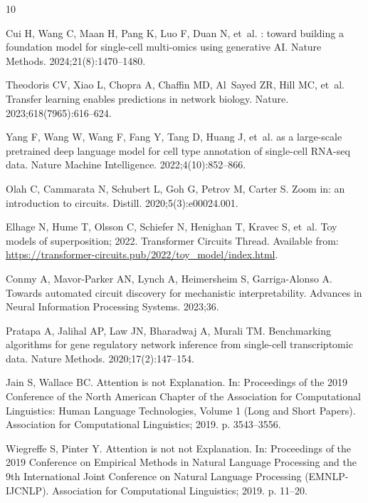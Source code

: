 \documentclass[10pt,letterpaper]{article}
\begin{document}
\begin{thebibliography}{10}

Cui H, Wang C, Maan H, Pang K, Luo F, Duan N, et~al.
: toward building a foundation model for single-cell
  multi-omics using generative {AI}.
\newblock Nature Methods. 2024;21(8):1470--1480.

Theodoris CV, Xiao L, Chopra A, Chaffin MD, Al~Sayed ZR, Hill MC, et~al.
\newblock Transfer learning enables predictions in network biology.
\newblock Nature. 2023;618(7965):616--624.

Yang F, Wang W, Wang F, Fang Y, Tang D, Huang J, et~al.
 as a large-scale pretrained deep language model for cell
  type annotation of single-cell {RNA-seq} data.
\newblock Nature Machine Intelligence. 2022;4(10):852--866.

Olah C, Cammarata N, Schubert L, Goh G, Petrov M, Carter S.
\newblock Zoom in: an introduction to circuits.
\newblock Distill. 2020;5(3):e00024.001.

Elhage N, Hume T, Olsson C, Schiefer N, Henighan T, Kravec S, et~al. Toy
  models of superposition; 2022.
\newblock Transformer Circuits Thread.
\newblock Available from:
  \url{https://transformer-circuits.pub/2022/toy_model/index.html}.

Conmy A, Mavor-Parker AN, Lynch A, Heimersheim S, Garriga-Alonso A.
\newblock Towards automated circuit discovery for mechanistic interpretability.
\newblock Advances in Neural Information Processing Systems. 2023;36.

Pratapa A, Jalihal AP, Law JN, Bharadwaj A, Murali TM.
\newblock Benchmarking algorithms for gene regulatory network inference from
  single-cell transcriptomic data.
\newblock Nature Methods. 2020;17(2):147--154.

Jain S, Wallace BC.
\newblock Attention is not Explanation.
\newblock In: Proceedings of the 2019 Conference of the North American Chapter
  of the Association for Computational Linguistics: Human Language
  Technologies, Volume 1 (Long and Short Papers). Association for Computational
  Linguistics; 2019. p. 3543--3556.

Wiegreffe S, Pinter Y.
\newblock Attention is not not Explanation.
\newblock In: Proceedings of the 2019 Conference on Empirical Methods in
  Natural Language Processing and the 9th International Joint Conference on
  Natural Language Processing (EMNLP-IJCNLP). Association for Computational
  Linguistics; 2019. p. 11--20.


\end{thebibliography}
\end{document}
